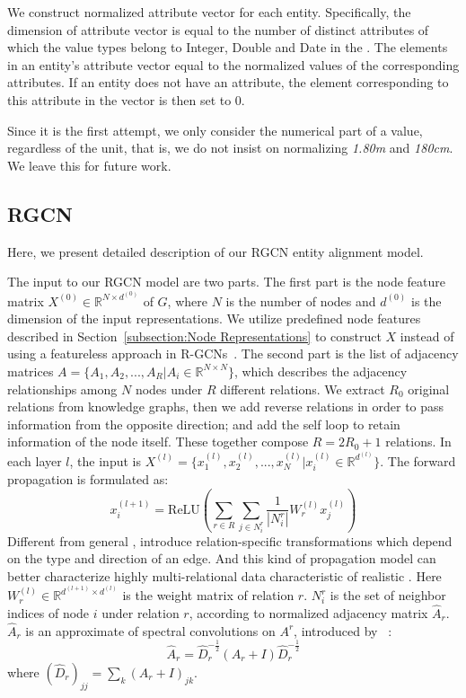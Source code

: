 	We construct normalized attribute vector for each entity. 
	Specifically, the dimension of attribute vector is equal to the number of distinct attributes of which the value types belong to Integer, Double and Date in the \KG. 
	The elements in an entity’s attribute vector equal to the normalized values of the corresponding attributes. 
	If an entity does not have an attribute, the element corresponding to this attribute in the vector is then set to 0.
	
	Since it is the first attempt, we only consider the numerical part of a value, regardless of the unit, that is, we do not insist on normalizing \emph{1.80m} and \emph{180cm}. 
	We leave this for future work.
	
	\subsection{RGCN}
	\label{section:rgcn}
	Here, we present detailed description of our RGCN entity alignment model.
	
	The input to our RGCN model are two parts. The first part is the node feature matrix $X^{(0)} \in \mathbb{R}^{N \times d^{(0)}}$ of $G$, where $N$ is the number of nodes and $d^{(0)}$ is the dimension of the input representations. We utilize predefined node features described in Section~\ref{subsection:Node Representations} to construct $X$ instead of using a featureless approach in R-GCNs~\cite{Schlichtkrull2017Modeling}.
	The second part is the list of adjacency matrices $A=\{A_1,A_2,...,A_R |A_i \in \mathbb{R}^{N \times N} \}$, which describes the adjacency relationships among $N$ nodes under $R$ different relations. We extract $R_0$ original relations from knowledge graphs, then we add reverse relations in order to pass information from the opposite direction; and add the self loop to retain information of the node itself. These together compose $R=2R_0+1$ relations.
	In each layer $l$, the input is $X^{(l)} = \{x^{(l)}_1,x^{(l)}_2,...,x^{(l)}_{N} |x^{(l)}_{i} \in \mathbb{R}^{d^{(l)}}\}$. The forward propagation is formulated as:
	\begin{equation}
	x_i^{(l+1)}=\mathrm{ReLU} (\sum\limits_{r \in R}\sum\limits_{j \in N_i^r}\frac{1}{|N_i^r|}W_r^{(l)}x_j^{(l)})
	\end{equation}
	Different from general \GCNs, \RGCNs introduce relation-specific transformations which depend on the type and direction of an edge. And this kind of propagation model can better characterize highly multi-relational data characteristic of realistic \KGs. Here $W_r^{(l)} \in \mathbb{R}^{d^{(l+1)} \times d^{(l)}}$ is the weight matrix of relation $r$. $N_i^r$ is the set of neighbor indices of node $i$ under relation $r$, according to normalized adjacency matrix $\hat A_r$. $\hat A_r$ is an approximate of spectral convolutions on $A^r$, introduced by ~\cite{Kipf2016Semi}:
	\begin{equation}
	\hat A_r=\hat D_r^{- \frac{1}{2}}(A_r+I)\hat D_r^{- \frac{1}{2}}
	\end{equation}
	where $(\hat D_r)_{jj}=\sum_k(A_r+I)_{jk}$.
	
